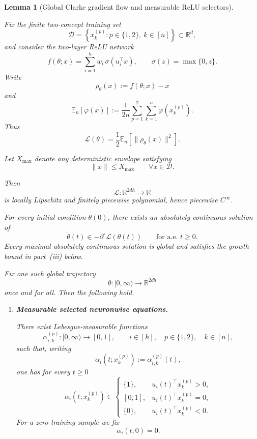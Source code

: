 \documentclass{article} %
\theoremstyle{plain}
\newtheorem{lemma}[theorem]{Lemma}
\theoremstyle{definition}
\theoremstyle{remark}
\begin{document}

\begin{lemma}[Global Clarke gradient flow and measurable ReLU selectors]
\label{lem:gf-regularity}

Fix the finite two-concept training set
\[
\mathcal D
=
\left\{
x_k^{(p)}:
p\in\{1,2\},\ k\in[n]
\right\}
\subset\mathbb R^d,
\]
and consider the two-layer ReLU network
\[
f(\theta;x)
=
\sum_{i=1}^h
w_i\,\sigma(u_i^\top x),
\qquad
\sigma(z)=\max\{0,z\}.
\]
Write
\[
\rho_\theta(x)
:=
f(\theta;x)-x
\]
and
\[
\mathbb E_n[\varphi(x)]
:=
\frac1{2n}
\sum_{p=1}^2
\sum_{k=1}^n
\varphi(x_k^{(p)}).
\]
Thus
\[
\mathcal L(\theta)
=
\frac12
\mathbb E_n
\left[
\|\rho_\theta(x)\|^2
\right].
\]

Let $X_{\max}$ denote any deterministic envelope satisfying
\[
\|x\|\le X_{\max}
\qquad
\forall x\in\mathcal D.
\]

Then
\[
\mathcal L:\mathbb R^{2dh}\to\mathbb R
\]
is locally Lipschitz and finitely piecewise polynomial, hence piecewise
$C^\infty$.

For every initial condition $\theta(0)$, there exists an absolutely
continuous solution of
\[
\dot\theta(t)
\in
-\partial^\circ\mathcal L(\theta(t))
\qquad
\text{for a.e. }t\ge0.
\]
Every maximal absolutely continuous solution is global and satisfies the
growth bound in part~\textnormal{(iii)} below.

Fix one such global trajectory
\[
\theta:[0,\infty)\to\mathbb R^{2dh}
\]
once and for all. Then the following hold.

\begin{enumerate}[label=(\roman*),leftmargin=2.4em]

\item
\textbf{Measurable selected neuronwise equations.}

There exist Lebesgue-measurable functions
\[
\alpha_{i,k}^{(p)}:[0,\infty)\to[0,1],
\qquad
i\in[h],\quad
p\in\{1,2\},\quad
k\in[n],
\]
such that, writing
\[
\alpha_i(t;x_k^{(p)})
:=
\alpha_{i,k}^{(p)}(t),
\]
one has for every $t\ge0$
\[
\alpha_i(t;x_k^{(p)})
\in
\begin{cases}
\{1\},
&
u_i(t)^\top x_k^{(p)}>0,
\\[1mm]
[0,1],
&
u_i(t)^\top x_k^{(p)}=0,
\\[1mm]
\{0\},
&
u_i(t)^\top x_k^{(p)}<0.
\end{cases}
\]
For a zero training sample we fix
\[
\alpha_i(t;0)=0.
\]


\end{enumerate}
\end{lemma}
\end{document}
